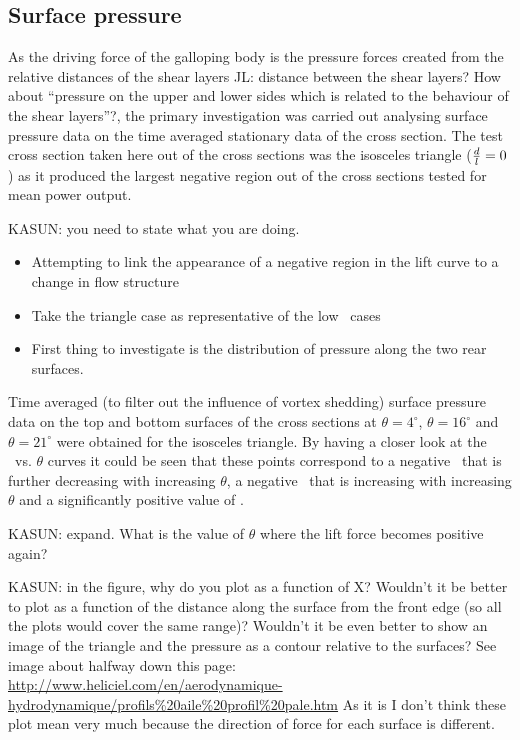 \subsection{Surface pressure}
\label{subsec:cross-sec-surface pressure}

As the driving force of the galloping body is the pressure forces created from the relative distances of the shear layers JL: distance between the shear layers? How about ``pressure on the upper and lower sides which is related to the behaviour of the shear layers''?, the primary investigation was carried out analysing surface pressure data on the time averaged stationary data of the cross section. The test cross section taken here out of the cross sections was the isosceles triangle ($\frac{d}{l}=0$) as it produced the largest negative region out of the cross sections tested for mean power output. 

KASUN: you need to state what you are doing.
\begin{itemize}
\item Attempting to link the appearance of a negative region in the
  lift curve to a change in flow structure
\item Take the triangle case as representative of the low \ratio\
  cases
\item First thing to investigate is the distribution of pressure along
  the two rear surfaces.
\end{itemize}

Time averaged (to filter out the influence of vortex shedding) surface pressure data  on the top and bottom surfaces of the cross sections at $\theta=4^{\circ}$, $\theta=16^{\circ}$ and $\theta=21^{\circ}$ were obtained for the isosceles triangle. By having a closer look at the \cy\ vs. $\theta$ curves it could be seen that these points correspond to a negative \cy\ that is further decreasing with increasing $\theta$, a negative \cy\ that is increasing with increasing $\theta$ and a significantly positive value of \cy.

KASUN: expand. What is the value of $\theta$ where the lift force becomes positive again? 
 
 

KASUN: in the figure, why do you plot as a function of X? Wouldn't it be better to plot as a function of the distance along the surface from the front edge (so all the plots would cover the same range)? Wouldn't it be even better to show an image of the triangle and the pressure as a contour relative to the surfaces? See image about halfway down this page: \url{http://www.heliciel.com/en/aerodynamique-hydrodynamique/profils\%20aile\%20profil\%20pale.htm} As it is I don't think these plot mean very much because the direction of force for each surface is different.

